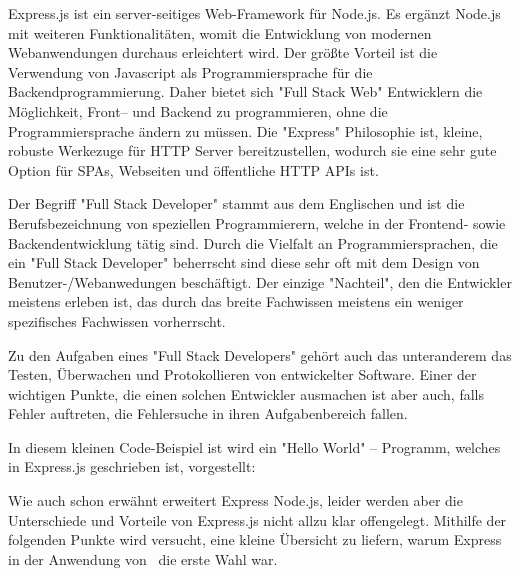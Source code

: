 
Express.js ist ein server-seitiges Web-Framework für Node.js. Es ergänzt Node.js mit weiteren Funktionalitäten, womit die Entwicklung von modernen Webanwendungen durchaus erleichtert wird. Der größte Vorteil ist die Verwendung von Javascript als Programmiersprache für die Backendprogrammierung. Daher bietet sich "Full Stack Web" Entwicklern die Möglichkeit, Front– und Backend zu programmieren, ohne die Programmiersprache ändern zu müssen. Die "Express" Philosophie ist, kleine, robuste Werkezuge für HTTP Server bereitzustellen, wodurch sie eine sehr gute Option für SPAs, Webseiten und öffentliche HTTP APIs ist. \cite{Express}

Der Begriff "Full Stack Developer" stammt aus dem Englischen und ist die Berufsbezeichnung von speziellen Programmierern, welche in der Frontend- sowie Backendentwicklung tätig sind. Durch die Vielfalt an Programmiersprachen, die ein "Full Stack Developer" beherrscht sind diese sehr oft mit dem Design von Benutzer-/Webanwedungen beschäftigt. Der einzige "Nachteil", den die Entwickler meistens erleben ist, das durch das breite Fachwissen meistens ein weniger spezifisches Fachwissen vorherrscht. 

Zu den Aufgaben eines "Full Stack Developers" gehört auch das unteranderem das Testen, Überwachen und Protokollieren von entwickelter Software. Einer der wichtigen Punkte, die einen solchen Entwickler ausmachen ist aber auch, falls Fehler auftreten, die Fehlersuche in ihren Aufgabenbereich fallen. \cite{FullStack}

\pagebreak
{}

In diesem kleinen Code-Beispiel ist wird ein "Hello World" – Programm, welches in Express.js geschrieben ist, vorgestellt:


\cite{Express}


Wie auch schon erwähnt erweitert Express Node.js, leider werden aber die Unterschiede und Vorteile von Express.js nicht allzu klar offengelegt. Mithilfe der folgenden Punkte wird versucht, eine kleine Übersicht zu liefern, warum Express in der Anwendung von \ZELIA\ die erste Wahl war.

